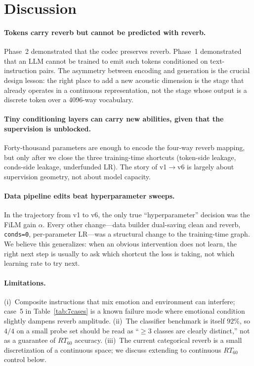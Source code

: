 \documentclass{article}
\begin{document}
\section{Discussion}

\paragraph{Tokens carry reverb but cannot be predicted with reverb.}
Phase~2 demonstrated that the codec preserves reverb. Phase~1 demonstrated
that an LLM cannot be trained to emit such tokens conditioned on
text-instruction pairs. The asymmetry between encoding and generation is the
crucial design lesson: the right place to add a new acoustic dimension is the
stage that already operates in a continuous representation, not the stage
whose output is a discrete token over a 4096-way vocabulary.

\paragraph{Tiny conditioning layers can carry new abilities, given that
the supervision is unblocked.} Forty-thousand parameters are enough to
encode the four-way reverb mapping, but only after we close the three
training-time shortcuts (token-side leakage, conds-side leakage,
underfunded LR). The story of v1$\to$v6 is largely about supervision
geometry, not about model capacity.

\paragraph{Data pipeline edits beat hyperparameter sweeps.} In the trajectory
from v1 to v6, the only true ``hyperparameter'' decision was the FiLM gain
$\alpha$. Every other change---data builder dual-saving clean and reverb,
\texttt{conds=0}, per-parameter LR---was a structural change to the
training-time graph. We believe this generalizes: when an obvious
intervention does not learn, the right next step is usually to ask which
shortcut the loss is taking, not which learning rate to try next.

\paragraph{Limitations.} (i)~Composite instructions that mix emotion and
environment can interfere; case~5 in Table~\ref{tab:7cases} is a known failure
mode where emotional condition slightly dampens reverb amplitude. (ii)~The
classifier benchmark is itself $92\%$, so $4/4$ on a small probe set should be
read as ``$\geq 3$ classes are clearly distinct,'' not as a guarantee of
$RT_{60}$ accuracy. (iii)~The current categorical reverb is a small
discretization of a continuous space; we discuss extending to continuous
$RT_{60}$ control below.
\end{document}
